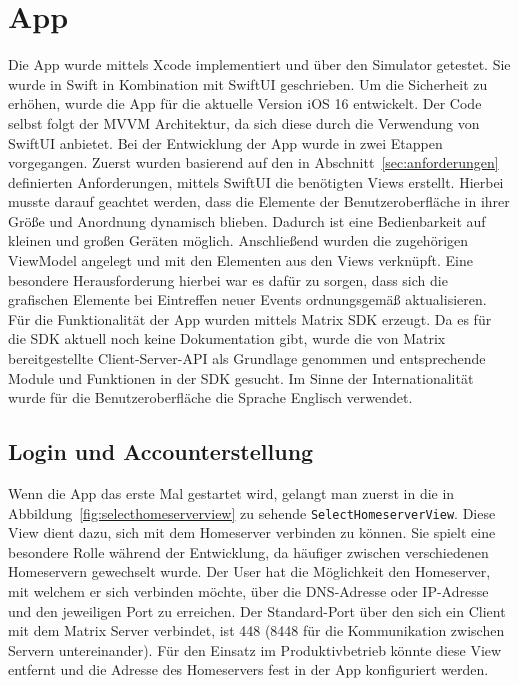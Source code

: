     \section{App}\label{sec:app}
    Die App wurde mittels Xcode implementiert und über den Simulator getestet.
    Sie wurde in Swift in Kombination mit SwiftUI geschrieben.
    Um die Sicherheit zu erhöhen, wurde die App für die aktuelle Version iOS 16 entwickelt.
    Der Code selbst folgt der MVVM Architektur, da sich diese durch die Verwendung von SwiftUI anbietet.
    Bei der Entwicklung der App wurde in zwei Etappen vorgegangen.
    Zuerst wurden basierend auf den in Abschnitt~\ref{sec:anforderungen} definierten Anforderungen, mittels SwiftUI die benötigten Views erstellt.
    Hierbei musste darauf geachtet werden, dass die Elemente der Benutzeroberfläche in ihrer Größe und Anordnung dynamisch blieben.
    Dadurch ist eine Bedienbarkeit auf kleinen und großen Geräten möglich.
    Anschließend wurden die zugehörigen ViewModel angelegt und mit den Elementen aus den Views verknüpft.
    Eine besondere Herausforderung hierbei war es dafür zu sorgen, dass sich die grafischen Elemente bei Eintreffen neuer Events ordnungsgemäß aktualisieren.
    Für die Funktionalität der App wurden mittels Matrix SDK erzeugt.
    Da es für die SDK aktuell noch keine Dokumentation gibt, wurde die von Matrix bereitgestellte Client-Server-API als Grundlage genommen und entsprechende Module und Funktionen in der SDK gesucht.
    Im Sinne der Internationalität wurde für die Benutzeroberfläche die Sprache Englisch verwendet.

    \newpage
    \subsection{Login und Accounterstellung}\label{subsec:login-und-account-erstellung}

    Wenn die App das erste Mal gestartet wird, gelangt man zuerst in die in Abbildung~\ref{fig:selecthomeserverview} zu sehende \texttt{SelectHomeserverView}.
    Diese View dient dazu, sich mit dem Homeserver verbinden zu können.
    Sie spielt eine besondere Rolle während der Entwicklung, da häufiger zwischen verschiedenen Homeservern gewechselt wurde.
    Der User hat die Möglichkeit den Homeserver, mit welchem er sich verbinden möchte, über die DNS-Adresse oder IP-Adresse und den jeweiligen Port zu erreichen.
    Der Standard-Port über den sich ein Client mit dem Matrix Server verbindet, ist 448 (8448 für die Kommunikation zwischen Servern untereinander).
    Für den Einsatz im Produktivbetrieb könnte diese View entfernt und die Adresse des Homeservers fest in der App konfiguriert werden.

